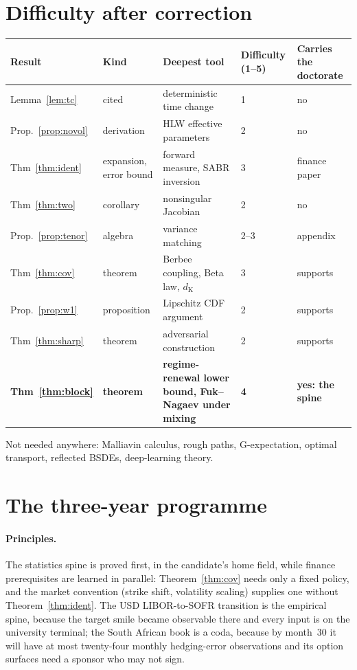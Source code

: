 \documentclass[11pt,a4paper]{article}
\theoremstyle{plain}
\theoremstyle{definition}
\theoremstyle{remark}
\newcommand{\dK}{d_{\mathrm{K}}}
\begin{document}
\section{Difficulty after correction}
\begin{center}\small
\begin{tabular}{@{}p{}p{}p{}p{}p{}@{}}
\toprule
Result & Kind & Deepest tool & Difficulty (1--5) & Carries the doctorate \\
\midrule
Lemma~\ref{lem:tc} & cited & deterministic time change & 1 & no \\
Prop.~\ref{prop:novol} & derivation & HLW effective parameters & 2 & no \\
Thm~\ref{thm:ident} & expansion, error bound & forward measure, SABR inversion & 3 & finance paper \\
Thm~\ref{thm:two} & corollary & nonsingular Jacobian & 2 & no \\
Prop.~\ref{prop:tenor} & algebra & variance matching & 2--3 & appendix \\
Thm~\ref{thm:cov} & theorem & Berbee coupling, Beta law, $\dK$ & 3 & supports \\
Prop.~\ref{prop:w1} & proposition & Lipschitz CDF argument & 2 & supports \\
Thm~\ref{thm:sharp} & theorem & adversarial construction & 2 & supports \\
\textbf{Thm~\ref{thm:block}} & \textbf{theorem} & \textbf{regime-renewal lower bound, Fuk--Nagaev under mixing} & \textbf{4} & \textbf{yes: the spine} \\
\bottomrule
\end{tabular}
\end{center}
Not needed anywhere: Malliavin calculus, rough paths, G-expectation, optimal transport, reflected BSDEs, deep-learning theory.

\section{The three-year programme}

\paragraph{Principles.} The statistics spine is proved first, in the candidate's home field, while finance prerequisites are learned in parallel: Theorem~\ref{thm:cov} needs only a fixed policy, and the market convention (strike shift, volatility scaling) supplies one without Theorem~\ref{thm:ident}. The USD LIBOR-to-SOFR transition is the empirical spine, because the target smile became observable there and every input is on the university terminal; the South African book is a coda, because by month~30 it will have at most twenty-four monthly hedging-error observations and its option surfaces need a sponsor who may not sign.
\end{document}
